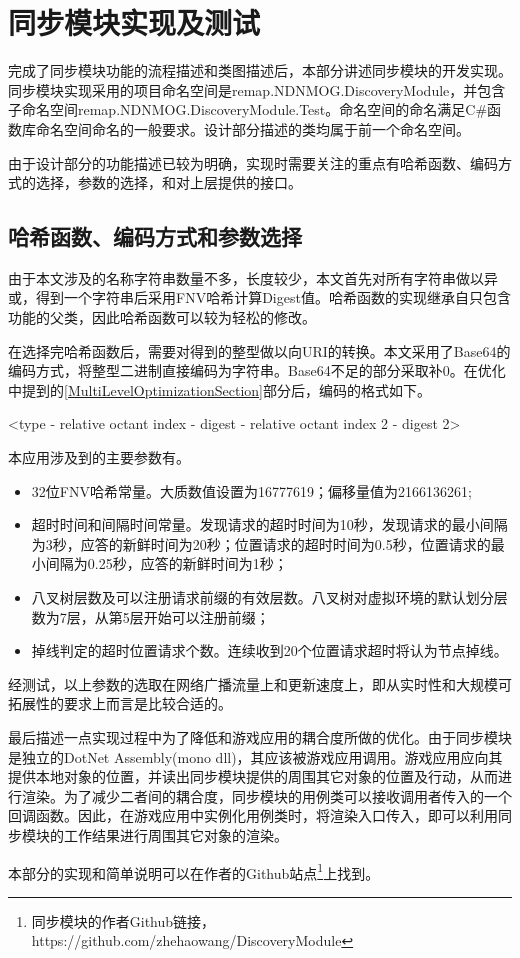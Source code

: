 \section{同步模块实现及测试}
\par
完成了同步模块功能的流程描述和类图描述后，本部分讲述同步模块的开发实现。同步模块实现采用的项目命名空间是remap.NDNMOG.DiscoveryModule，并包含子命名空间remap.NDNMOG.DiscoveryModule.Test。命名空间的命名满足C\#函数库命名空间命名的一般要求。设计部分描述的类均属于前一个命名空间。
\par
由于设计部分的功能描述已较为明确，实现时需要关注的重点有哈希函数、编码方式的选择，参数的选择，和对上层提供的接口。
\subsection{哈希函数、编码方式和参数选择}
\par
由于本文涉及的名称字符串数量不多，长度较少，本文首先对所有字符串做以异或，得到一个字符串后采用FNV哈希计算Digest值。哈希函数的实现继承自只包含功能的父类，因此哈希函数可以较为轻松的修改。
\par
在选择完哈希函数后，需要对得到的整型做以向URI的转换。本文采用了Base64的编码方式，将整型二进制直接编码为字符串。Base64不足的部分采取补0。在优化中提到的\ref{MultiLevelOptimizationSection}部分后，编码的格式如下。
\newline
\centerline{<type - relative octant index - digest - relative octant index 2 - digest 2>}
\par
本应用涉及到的主要参数有。
\begin{itemize}
\item
32位FNV哈希常量。大质数值设置为16777619；偏移量值为2166136261;
\item
超时时间和间隔时间常量。发现请求的超时时间为10秒，发现请求的最小间隔为3秒，应答的新鲜时间为20秒；位置请求的超时时间为0.5秒，位置请求的最小间隔为0.25秒，应答的新鲜时间为1秒；
\item
八叉树层数及可以注册请求前缀的有效层数。八叉树对虚拟环境的默认划分层数为7层，从第5层开始可以注册前缀；
\item
掉线判定的超时位置请求个数。连续收到20个位置请求超时将认为节点掉线。
\end{itemize}
\par
经测试，以上参数的选取在网络广播流量上和更新速度上，即从实时性和大规模可拓展性的要求上而言是比较合适的。
\par
最后描述一点实现过程中为了降低和游戏应用的耦合度所做的优化。由于同步模块是独立的DotNet Assembly(mono dll)，其应该被游戏应用调用。游戏应用应向其提供本地对象的位置，并读出同步模块提供的周围其它对象的位置及行动，从而进行渲染。为了减少二者间的耦合度，同步模块的用例类可以接收调用者传入的一个回调函数。因此，在游戏应用中实例化用例类时，将渲染入口传入，即可以利用同步模块的工作结果进行周围其它对象的渲染。
\par
本部分的实现和简单说明可以在作者的Github站点\footnote{同步模块的作者Github链接，https://github.com/zhehaowang/DiscoveryModule}上找到。
